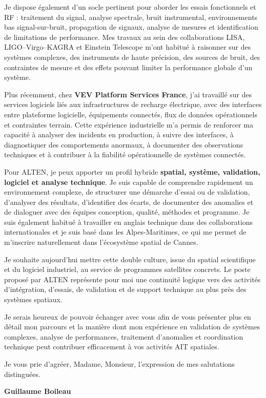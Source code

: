 \documentclass[11pt,a4paper]{altacv}
\begin{document}
{Je dispose également d'un socle pertinent pour aborder les essais fonctionnels et RF : traitement du signal, analyse spectrale, bruit instrumental, environnements bas signal-sur-bruit, propagation de signaux, analyse de mesures et identification de limitations de performance. Mes travaux au sein des collaborations LISA, LIGO--Virgo--KAGRA et Einstein Telescope m'ont habitué à raisonner sur des systèmes complexes, des instruments de haute précision, des sources de bruit, des contraintes de mesure et des effets pouvant limiter la performance globale d'un système.

Plus récemment, chez \textbf{VEV Platform Services France}, j'ai travaillé sur des services logiciels liés aux infrastructures de recharge électrique, avec des interfaces entre plateforme logicielle, équipements connectés, flux de données opérationnels et contraintes terrain. Cette expérience industrielle m'a permis de renforcer ma capacité à analyser des incidents en production, à suivre des interfaces, à diagnostiquer des comportements anormaux, à documenter des observations techniques et à contribuer à la fiabilité opérationnelle de systèmes connectés.

Pour ALTEN, je peux apporter un profil hybride \textbf{spatial, système, validation, logiciel et analyse technique}. Je suis capable de comprendre rapidement un environnement complexe, de structurer une démarche d'essai ou de validation, d'analyser des résultats, d'identifier des écarts, de documenter des anomalies et de dialoguer avec des équipes conception, qualité, méthodes et programme. Je suis également habitué à travailler en anglais technique dans des collaborations internationales et je suis basé dans les Alpes-Maritimes, ce qui me permet de m'inscrire naturellement dans l'écosystème spatial de Cannes.

Je souhaite aujourd'hui mettre cette double culture, issue du spatial scientifique et du logiciel industriel, au service de programmes satellites concrets. Le poste proposé par ALTEN représente pour moi une continuité logique vers des activités d'intégration, d'essais, de validation et de support technique au plus près des systèmes spatiaux.

Je serais heureux de pouvoir échanger avec vous afin de vous présenter plus en détail mon parcours et la manière dont mon expérience en validation de systèmes complexes, analyse de performances, traitement d'anomalies et coordination technique peut contribuer efficacement à vos activités AIT spatiales.

Je vous prie d'agréer, Madame, Monsieur, l'expression de mes salutations distinguées.

\textbf{Guillaume Boileau}

}
\end{document}
